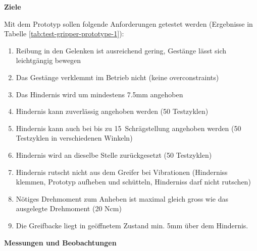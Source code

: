 \textbf{Ziele}

Mit dem Prototyp sollen folgende Anforderungen getestet werden (Ergebnisse in Tabelle \ref{tab:test-gripper-prototype-1}):
\begin{enumerate}
    \item Reibung in den Gelenken ist ausreichend gering, Gestänge lässt sich leichtgängig bewegen
    \item Das Gestänge verklemmt im Betrieb nicht (keine overconstraints)
    \item Das Hindernis wird um mindestens 7.5mm angehoben
    \item Hindernis kann zuverlässig angehoben werden (50 Testzyklen)
    \item Hindernis kann auch bei bis zu 15\textdegree\ Schrägstellung angehoben werden (50 Testzyklen in verschiedenen Winkeln)
    \item Hindernis wird \pm 2mm an dieselbe Stelle zurückgesetzt (50 Testzyklen)
    \item Hindernis rutscht nicht aus dem Greifer bei Vibrationen (Hinderniss klemmen, Prototyp aufheben und schütteln, Hinderniss darf nicht rutschen)
    \item Nötiges Drehmoment zum Anheben ist maximal gleich gross wie das ausgelegte Drehmoment (20 Ncm)
    \item Die Greifbacke liegt in geöffnetem Zustand min. 5mm über dem Hindernis.
\end{enumerate}
\newpage

\textbf{Messungen und Beobachtungen}

